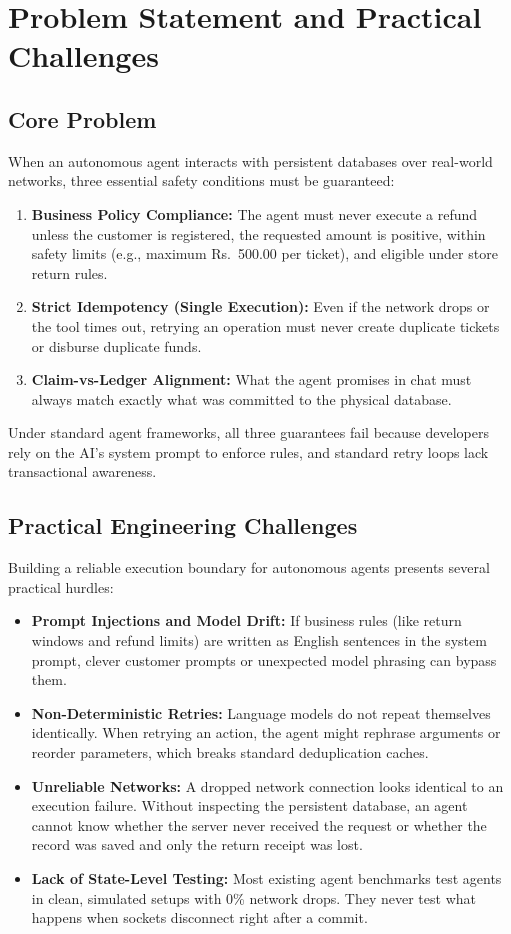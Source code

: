 \section{Problem Statement and Practical Challenges}

\subsection{Core Problem}

When an autonomous agent interacts with persistent databases over real-world networks, three essential safety conditions must be guaranteed:
\begin{enumerate}
    \item \textbf{Business Policy Compliance:} The agent must never execute a refund unless the customer is registered, the requested amount is positive, within safety limits (e.g., maximum Rs.~500.00 per ticket), and eligible under store return rules.
    \item \textbf{Strict Idempotency (Single Execution):} Even if the network drops or the tool times out, retrying an operation must never create duplicate tickets or disburse duplicate funds.
    \item \textbf{Claim-vs-Ledger Alignment:} What the agent promises in chat must always match exactly what was committed to the physical database.
\end{enumerate}

Under standard agent frameworks, all three guarantees fail because developers rely on the AI's system prompt to enforce rules, and standard retry loops lack transactional awareness.

\subsection{Practical Engineering Challenges}

Building a reliable execution boundary for autonomous agents presents several practical hurdles:
\begin{itemize}
    \item \textbf{Prompt Injections and Model Drift:} If business rules (like return windows and refund limits) are written as English sentences in the system prompt, clever customer prompts or unexpected model phrasing can bypass them.
    \item \textbf{Non-Deterministic Retries:} Language models do not repeat themselves identically. When retrying an action, the agent might rephrase arguments or reorder parameters, which breaks standard deduplication caches.
    \item \textbf{Unreliable Networks:} A dropped network connection looks identical to an execution failure. Without inspecting the persistent database, an agent cannot know whether the server never received the request or whether the record was saved and only the return receipt was lost.
    \item \textbf{Lack of State-Level Testing:} Most existing agent benchmarks test agents in clean, simulated setups with 0\% network drops. They never test what happens when sockets disconnect right after a commit.
\end{itemize}

